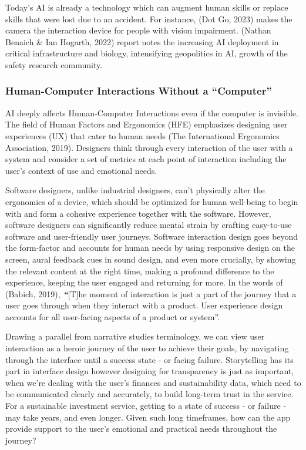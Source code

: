 \documentclass[
  12pt,
  letterpaper,
  DIV=11,
  numbers=noendperiod]{scrartcl}
\begin{document}
Today's AI is already a technology which can augment human skills or
replace skills that were lost due to an accident. For instance, (Dot Go,
2023) makes the camera the interaction device for people with vision
impairment. (Nathan Benaich \& Ian Hogarth, 2022) report notes the
increasing AI deployment in critical infrastructure and biology,
intensifying geopolitics in AI, growth of the safety research community.

\subsubsection{Human-Computer Interactions Without a
``Computer''}\label{human-computer-interactions-without-a-computer}

AI deeply affects Human-Computer Interactions even if the computer is
invisible. The field of Human Factors and Ergonomics (HFE) emphasizes
designing user experiences (UX) that cater to human needs (The
International Ergonomics Association, 2019). Designers think through
every interaction of the user with a system and consider a set of
metrics at each point of interaction including the user's context of use
and emotional needs.

Software designers, unlike industrial designers, can't physically alter
the ergonomics of a device, which should be optimized for human
well-being to begin with and form a cohesive experience together with
the software. However, software designers can significantly reduce
mental strain by crafting easy-to-use software and user-friendly user
journeys. Software interaction design goes beyond the form-factor and
accounts for human needs by using responsive design on the screen, aural
feedback cues in sound design, and even more crucially, by showing the
relevant content at the right time, making a profound difference to the
experience, keeping the user engaged and returning for more. In the
words of (Babich, 2019), \textbf{\emph{``}}{[}T{]}he moment of
interaction is just a part of the journey that a user goes through when
they interact with a product. User experience design accounts for all
user-facing aspects of a product or system''.

Drawing a parallel from narrative studies terminology, we can view user
interaction as a heroic journey of the user to achieve their goals, by
navigating through the interface until a success state - or facing
failure. Storytelling has its part in interface design however designing
for transparency is just as important, when we're dealing with the
user's finances and sustainability data, which need to be communicated
clearly and accurately, to build long-term trust in the service. For a
sustainable investment service, getting to a state of success - or
failure - may take years, and even longer. Given such long timeframes,
how can the app provide support to the user's emotional and practical
needs throughout the journey?
\end{document}
